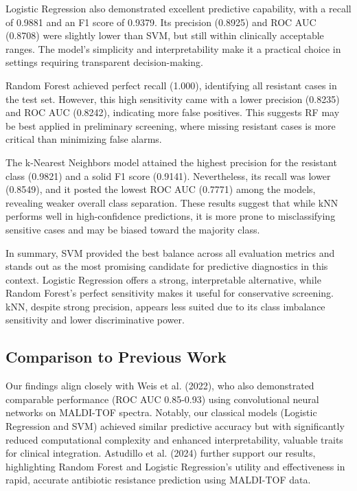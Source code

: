 \documentclass{article}
\begin{document}
Logistic Regression also demonstrated excellent predictive capability, with a recall of 0.9881 and an F1 score of 0.9379. Its precision (0.8925) and ROC AUC (0.8708) were slightly lower than SVM, but still within clinically acceptable ranges. The model's simplicity and interpretability make it a practical choice in settings requiring transparent decision-making.

Random Forest achieved perfect recall (1.000), identifying all resistant cases in the test set. However, this high sensitivity came with a lower precision (0.8235) and ROC AUC (0.8242), indicating more false positives. This suggests RF may be best applied in preliminary screening, where missing resistant cases is more critical than minimizing false alarms.

The k-Nearest Neighbors model attained the highest precision for the resistant class (0.9821) and a solid F1 score (0.9141). Nevertheless, its recall was lower (0.8549), and it posted the lowest ROC AUC (0.7771) among the models, revealing weaker overall class separation. These results suggest that while kNN performs well in high-confidence predictions, it is more prone to misclassifying sensitive cases and may be biased toward the majority class.

In summary, SVM provided the best balance across all evaluation metrics and stands out as the most promising candidate for predictive diagnostics in this context. Logistic Regression offers a strong, interpretable alternative, while Random Forest's perfect sensitivity makes it useful for conservative screening. kNN, despite strong precision, appears less suited due to its class imbalance sensitivity and lower discriminative power.


\subsection{Comparison to Previous Work}

Our findings align closely with Weis et al. (2022), who also demonstrated comparable performance (ROC AUC 0.85-0.93) using convolutional neural networks on MALDI-TOF spectra. Notably, our classical models (Logistic Regression and SVM) achieved similar predictive accuracy but with significantly reduced computational complexity and enhanced interpretability, valuable traits for clinical integration. Astudillo et al. (2024) further support our results, highlighting Random Forest and Logistic Regression's utility and effectiveness in rapid, accurate antibiotic resistance prediction using MALDI-TOF data.
\end{document}
